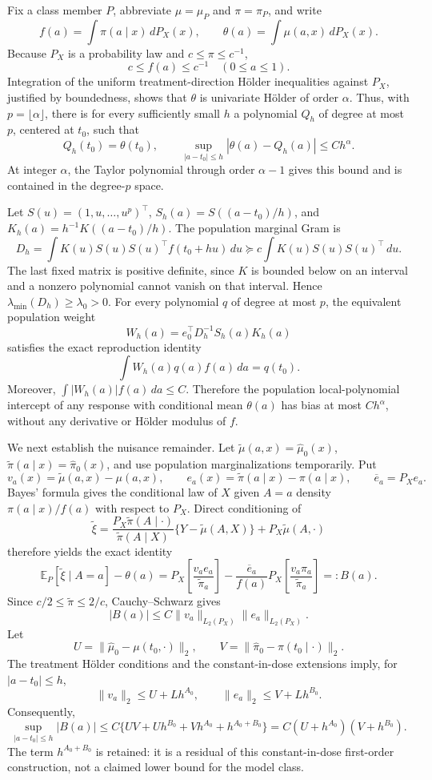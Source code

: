 Fix a class member \(P\), abbreviate \(\mu=\mu_P\) and \(\pi=\pi_P\), and write
\[
f(a)=\int\pi(a\mid x)\,dP_X(x),
\qquad
\theta(a)=\int\mu(a,x)\,dP_X(x).
\]
Because \(P_X\) is a probability law and \(c\le\pi\le c^{-1}\),
\[
c\le f(a)\le c^{-1}\quad(0\le a\le1).
\]
Integration of the uniform treatment-direction Hölder inequalities against \(P_X\), justified by boundedness, shows that \(\theta\) is univariate Hölder of order \(\alpha\). Thus, with \(p=\lfloor\alpha\rfloor\), there is for every sufficiently small \(h\) a polynomial \(Q_h\) of degree at most \(p\), centered at \(t_0\), such that
\[
Q_h(t_0)=\theta(t_0),
\qquad
\sup_{|a-t_0|\le h}|\theta(a)-Q_h(a)|\le Ch^\alpha.
\]
At integer \(\alpha\), the Taylor polynomial through order \(\alpha-1\) gives this bound and is contained in the degree-\(p\) space.

Let \(S(u)=(1,u,\ldots,u^p)^\top\), \(S_h(a)=S((a-t_0)/h)\), and \(K_h(a)=h^{-1}K((a-t_0)/h)\). The population marginal Gram is
\[
D_h=\int K(u)S(u)S(u)^\top f(t_0+hu)\,du
\succeq c\int K(u)S(u)S(u)^\top\,du.
\]
The last fixed matrix is positive definite, since \(K\) is bounded below on an interval and a nonzero polynomial cannot vanish on that interval. Hence \(\lambda_{\min}(D_h)\ge\lambda_0>0\). For every polynomial \(q\) of degree at most \(p\), the equivalent population weight
\[
W_h(a)=e_0^\top D_h^{-1}S_h(a)K_h(a)
\]
satisfies the exact reproduction identity
\[
\int W_h(a)q(a)f(a)\,da=q(t_0).
\]
Moreover, \(\int|W_h(a)|f(a)\,da\le C\). Therefore the population local-polynomial intercept of any response with conditional mean \(\theta(a)\) has bias at most \(Ch^\alpha\), without any derivative or Hölder modulus of \(f\).

We next establish the nuisance remainder. Let \(\widetilde\mu(a,x)=\widehat\mu_0(x)\), \(\widetilde\pi(a\mid x)=\widehat\pi_0(x)\), and use population marginalizations temporarily. Put
\[
v_a(x)=\widetilde\mu(a,x)-\mu(a,x),
\qquad
e_a(x)=\widetilde\pi(a\mid x)-\pi(a\mid x),
\qquad
\overline e_a=P_Xe_a.
\]
Bayes' formula gives the conditional law of \(X\) given \(A=a\) density \(\pi(a\mid x)/f(a)\) with respect to \(P_X\). Direct conditioning of
\[
\widetilde\xi=
\frac{P_X\widetilde\pi(A\mid\cdot)}{\widetilde\pi(A\mid X)}
\{Y-\widetilde\mu(A,X)\}+P_X\widetilde\mu(A,\cdot)
\]
therefore yields the exact identity
\[
\mathbb E_P[\widetilde\xi\mid A=a]-\theta(a)
=P_X\left[\frac{v_ae_a}{\widetilde\pi_a}\right]
-\frac{\overline e_a}{f(a)}P_X\left[\frac{v_a\pi_a}{\widetilde\pi_a}\right]
=:B(a).
\]
Since \(c/2\le\widetilde\pi\le2/c\), Cauchy--Schwarz gives
\[
|B(a)|\le C\lVert v_a\rVert_{L_2(P_X)}\lVert e_a\rVert_{L_2(P_X)}.
\]
Let
\[
U=\lVert\widehat\mu_0-\mu(t_0,\cdot)\rVert_2,
\qquad
V=\lVert\widehat\pi_0-\pi(t_0\mid\cdot)\rVert_2.
\]
The treatment Hölder conditions and the constant-in-dose extensions imply, for \(|a-t_0|\le h\),
\[
\lVert v_a\rVert_2\le U+Lh^{A_0},
\qquad
\lVert e_a\rVert_2\le V+Lh^{B_0}.
\]
Consequently,
\[
\sup_{|a-t_0|\le h}|B(a)|
\le C\{UV+Uh^{B_0}+Vh^{A_0}+h^{A_0+B_0}\}
=C(U+h^{A_0})(V+h^{B_0}).
\]
The term \(h^{A_0+B_0}\) is retained: it is a residual of this constant-in-dose first-order construction, not a claimed lower bound for the model class.

